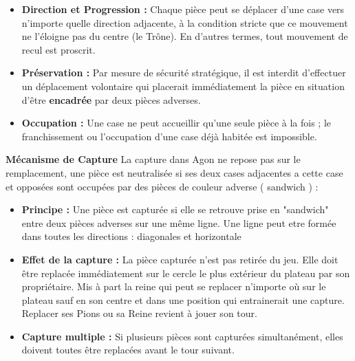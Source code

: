 \documentclass[10pt]{article} %
\begin{document}
\begin{itemize}
    \item[$\bullet$] \textbf{Direction et Progression :} Chaque pièce peut se déplacer d'une case vers n'importe quelle direction adjacente, à la condition stricte que ce mouvement ne l'éloigne pas du centre (le Trône). En d'autres termes, tout mouvement de recul est proscrit. 
    
    \bigskip
    
    \item[$\bullet$] \textbf{Préservation :} Par mesure de sécurité stratégique, il est interdit d'effectuer un déplacement volontaire qui placerait immédiatement la pièce en situation d'être \textbf{encadrée} par deux pièces adverses.
    
    \bigskip
    
    \item[$\bullet$] \textbf{Occupation :} Une case ne peut accueillir qu'une seule pièce à la fois ; le franchissement ou l'occupation d'une case déjà habitée est impossible.

\end{itemize}
\medskip
\medskip
\indent \textbf{Mécanisme de Capture}
La capture dans Agon ne repose pas sur le remplacement, une pièce est neutralisée si ses deux cases adjacentes a cette case et opposées sont occupées par des pièces de couleur adverse ( sandwich ) :
\begin{itemize}
\bigskip
    \item[$\bullet$] \textbf{Principe :} Une pièce est capturée si elle se retrouve prise en "sandwich" entre deux pièces adverses sur une même ligne. Une ligne peut etre formée dans toutes les directions : diagonales et horizontale

    \bigskip
    
    \item[$\bullet$] \textbf{Effet de la capture :} La pièce capturée n'est pas retirée du jeu. Elle doit être replacée immédiatement sur le cercle le plus extérieur du plateau par son propriétaire. Mis à part la reine qui peut se replacer n'importe où sur le plateau sauf en son centre et dans une position qui entrainerait une capture. Replacer ses Pions ou sa Reine revient à jouer son tour.

    \bigskip
    
    \item[$\bullet$] \textbf{Capture multiple :} Si plusieurs pièces sont capturées simultanément, elles doivent toutes être replacées avant le tour suivant.
\end{itemize}
\medskip
\end{document}
